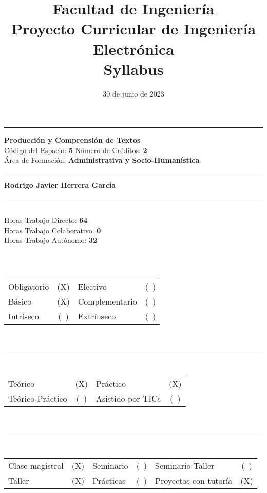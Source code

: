 \documentclass{article}
\title{{\bf Facultad de Ingeniería} \\ {\small Proyecto Curricular de Ingeniería Electrónica} \\ Syllabus}
\date{30 de junio de 2023}
\begin{document}
\maketitle

\noindent\rule[0.8ex]{12.1cm}{0.25pt} \par
{} {\bf Producción y Comprensión de Textos} \\
\noindent Código del Espacio: {\bf 5} \qquad Número de Créditos: {\bf 2} \\
\noindent Área de Formación: {\bf Administrativa y Socio-Humanística} \\

\noindent\rule[0.8ex]{12.1cm}{0.25pt} \par
{} {\bf Rodrigo Javier Herrera García} \\

\noindent\rule[0.8ex]{12.1cm}{0.25pt} \par
{} \\
\noindent Horas Trabajo Directo: {\bf 64} \\ Horas Trabajo Colaborativo: {\bf 0} \\ Horas Trabajo Autónomo: {\bf 32} \\

\noindent\rule[0.8ex]{12.1cm}{0.25pt} \par
{} \\
\begin{tabular}{lclc}
Obligatorio & (X)  & Electivo       & (\ ) \\
Básico      & (X)  & Complementario & (\ ) \\
Intríseco   & (\ ) & Extrínseco     & (\ ) \\
\end{tabular} \\

\noindent\rule[0.8ex]{12.1cm}{0.25pt} \par
{} \\
\begin{tabular}{lclc}
Teórico          & (X) & Práctico   & (X) \\
Teórico-Práctico & (\ ) & Asistido por TICs & (\ ) \\
\end{tabular} \\

\noindent\rule[0.8ex]{12.1cm}{0.25pt} \par
{} \\
\begin{tabular}{lclclc}
Clase magistral & (X) & Seminario & (\ ) & Seminario-Taller & (\ ) \\
Taller & (X) & Prácticas & (\ ) & Proyectos con tutoría & (X) \\
\end{tabular} \\
\end{document}
